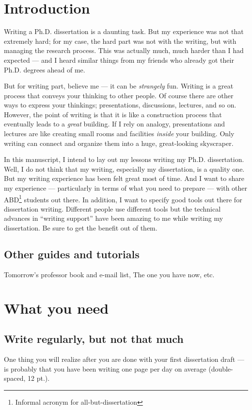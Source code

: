 \documentclass[11pt]{article}
\begin{document}
\section{Introduction}

Writing a Ph.D. dissertation is a daunting task. But my experience
was not that extremely hard; for my case, the hard part was not
with the writing, but with managing the research process. This was
actually much, much harder than I had expected --- and I heard
similar things from my friends who already got their Ph.D. degrees
ahead of me.

But for writing part, believe me --- it can be \emph{strangely}
fun.  Writing is a great process that conveys your thinking to
other people.  Of course there are other ways to express your
thinkings; presentations, discussions, lectures, and so on.
However, the point of writing is that it is like a construction
process that eventually leads to a \emph{great} building.  If I
rely on analogy, presentations and lectures are like creating
small rooms and facilities \emph{inside} your building. Only
writing can connect and organize them into a huge, great-looking
skyscraper.

In this manuscript, I intend to lay out my lessons writing my
Ph.D.  dissertation. Well, I do not think that my writing,
especially my dissertation, is a quality one. But my writing
experience has been felt great most of time. And I want to share
my experience --- particularly in terms of what you need to
prepare --- with other ABD\footnote{Informal acronym for
all-but-dissertation} students out there. In addition, I want to
specify good tools out there for dissertation writing.  Different
people use different tools but the technical advances in ``writing
support'' have been amazing to me while writing my dissertation.
Be sure to get the benefit out of them.

\subsection{Other guides and tutorials}
Tomorrow's professor book and e-mail list, The one you have now, etc.

\section{What you need}

\subsection{Write regularly, but not that much}
One thing you will realize after you are done with your first
dissertation draft --- is probably that you have been writing one
page per day on average (double-spaced, 12 pt.).
\end{document}
